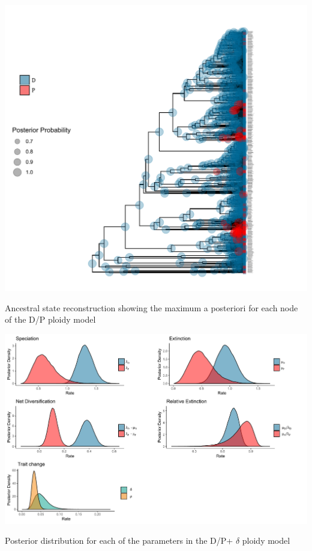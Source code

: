 \begin{suppfigure}
\includegraphics[width=\textwidth]{asrDP.pdf}
\caption{Ancestral state reconstruction showing the maximum a posteriori for each node of the D/P ploidy model} %
\label{suppfigure:DPnodipasr}
\end{suppfigure}

\begin{suppfigure}
\includegraphics[width=\textwidth]{bisseDPposteriordist.pdf}
\caption{Posterior distribution for each of the parameters in the D/P+ $\delta$ ploidy model} %
\label{suppfigure:DP}
\end{suppfigure}

